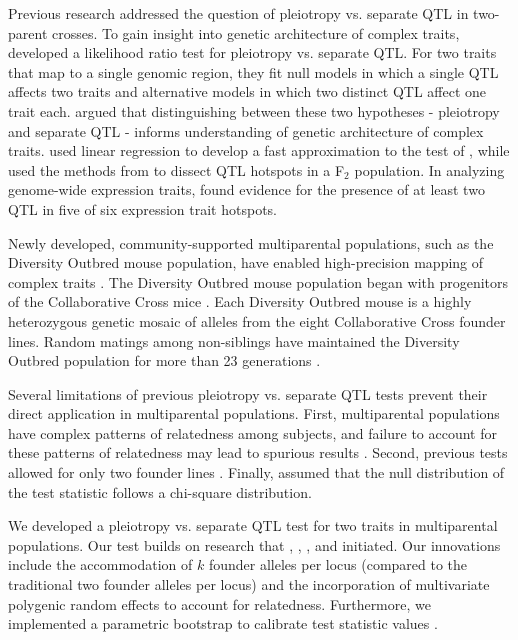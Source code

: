 \documentclass[12pt,twoside, lineno]{gsajnl}
\begin{document}
Previous research addressed the question of pleiotropy vs. separate QTL in two-parent crosses. To gain insight into genetic architecture of complex traits, \citet{jiang1995multiple} developed a likelihood ratio test for pleiotropy vs. separate QTL. For two traits that map to a single genomic region, they fit null models in which a single QTL affects two traits and alternative models in which two distinct QTL affect one trait each.  \citet{jiang1995multiple} argued that distinguishing between these two hypotheses - pleiotropy and separate QTL - informs understanding of genetic architecture of complex traits. \citet{knott2000multitrait} used linear regression to develop a fast approximation to the test of \citet{jiang1995multiple}, while \citet{tian2016dissection} used the methods from \citet{knott2000multitrait} to dissect QTL hotspots in a F$_2$ population. In analyzing genome-wide expression traits, \citet{tian2016dissection} found evidence for the presence of at least two QTL in five of six expression trait hotspots.


Newly developed, community-supported multiparental populations, such as the Diversity Outbred mouse population, have enabled high-precision mapping of complex traits \citep{de2014genetics}. The Diversity Outbred mouse population began with progenitors of the Collaborative Cross mice \citep{churchill2004collaborative,churchill2012diversity}. Each Diversity Outbred mouse is a highly heterozygous genetic mosaic of alleles from the eight Collaborative Cross founder lines. Random matings among non-siblings have maintained the Diversity Outbred population for more than 23 generations \citep{chesler2016diversity}.


Several limitations of previous pleiotropy vs. separate QTL tests prevent their direct application in multiparental populations. First, multiparental populations have complex patterns of relatedness among subjects, and failure to account for these patterns of relatedness may lead to spurious results \citep{yang2014advantages}. Second, previous tests allowed for only two founder lines \citep{jiang1995multiple}. Finally, \citet{jiang1995multiple} assumed that the null distribution of the test statistic follows a chi-square distribution.

We developed a pleiotropy vs. separate QTL test for two traits in multiparental populations. Our test builds on research that \citet{jiang1995multiple}, \citet{knott2000multitrait}, \citet{tian2016dissection}, and \citet{zhou2014efficient} initiated. Our innovations include the accommodation of $k$ founder alleles per locus (compared to the traditional two founder alleles per locus) and the incorporation of multivariate polygenic random effects to account for relatedness. Furthermore, we implemented a parametric bootstrap to calibrate test statistic values \citep{efron1979,tian2016dissection}.
\end{document}
